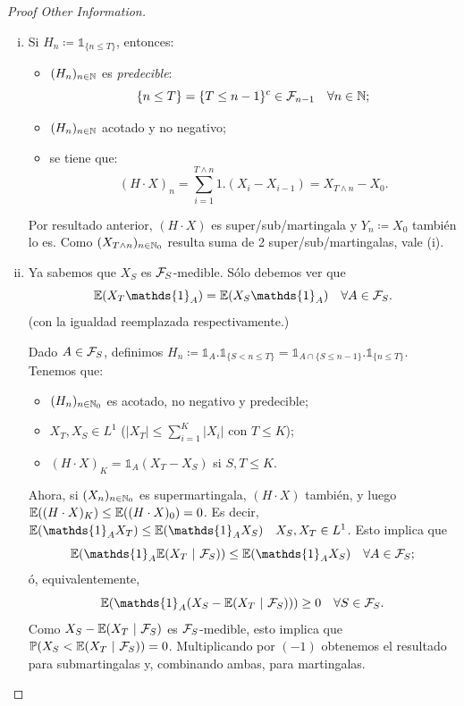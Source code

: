 \begin{proof}[Proof Other Information]
	\begin{enumerate}[i)]
		\item Si $H_{n} \coloneq \mathds{1}_{\{n \leq T\}}$, entonces:
		\begin{itemize}
			\item $(H_{n})_{n \in \mathbb{N}}$ es \textit{predecible}:
			\[ \{n \leq T\} = \{T \leq n - 1\}^{c} \in \mathcal{F}_{n-1} \quad \forall n \in \mathbb{N}; \]

			\item $(H_{n})_{n \in \mathbb{N}}$ acotado y no negativo;

			\item se tiene que:
			\[ (H \cdot X)_{n} = \sum_{i=1}^{T \wedge n} 1 . (X_{i} - X_{i-1}) = X_{T \wedge n} - X_{0}. \]
		\end{itemize}
		Por resultado anterior, $(H \cdot X)$ es super/sub/martingala y $Y_{n} \coloneq X_{0}$ también lo es. Como $(X_{T \wedge n})_{n \in \mathbb{N}_{0}}$ resulta suma de 2 super/sub/martingalas, vale (i).
		
		\item Ya sabemos que $X_{S}$ es $\mathcal{F}_{S}$-medible. Sólo debemos ver que
		\[ \mbb{E}(X_{T} \mathds{1}_{A}) = \mbb{E}(X_{S} \mathds{1}_{A}) \quad \forall A \in \mcal{F}_{S}. \]
		(con la igualdad reemplazada respectivamente.) \par
		Dado $A \in \mathcal{F}_{S}$, definimos $H_{n} \coloneq \mathds{1}_{A} . \mathds{1}_{\{S < n \leq T\}} = \mathds{1}_{A \cap \{S \leq n-1\}} . \mathds{1}_{\{n \leq T\}}$. Tenemos que:
		\begin{itemize}
			\item $(H_{n})_{n \in \mathbb{N}_{0}}$ es acotado, no negativo y predecible;

			\item $X_{T}, X_{S} \in L^{1}$ ($|X_{T}| \leq \sum_{i=1}^{K} |X_{i}|$ con $T \leq K$);

			\item $(H \cdot X)_{K} = \mathds{1}_{A} (X_{T} - X_{S})$ si $S,T \leq K$.
		\end{itemize}
		Ahora, si $(X_{n})_{n \in \mathbb{N}_{0}}$ es supermartingala, $(H \cdot X)$ también, y luego $\mathbb{E}((H \cdot X)_{K}) \leq \mathbb{E}((H \cdot X)_{0}) = 0$. Es decir, $\mbb{E}(\mathds{1}_{A} X_{T}) \leq \mbb{E}(\mathds{1}_{A} X_{S}) \quad X_{S}, X_{T} \in L^{1}$. Esto implica que
		\[ \mbb{E}(\mathds{1}_{A} \mbb{E}(X_{T} \ | \ \mcal{F}_{S})) \leq \mbb{E}(\mathds{1}_{A} X_{S}) \quad \forall A \in \mcal{F}_{S}; \]
		ó, equivalentemente,
		\[ \mbb{E}(\mathds{1}_{A}(X_{S} - \mbb{E}(X_{T} \ | \ \mcal{F}_{S}))) \geq 0 \quad \forall S \in \mcal{F}_{S}. \]
		Como $X_{S} - \mbb{E}(X_{T} \ | \ \mcal{F}_{S})$ es $\mathcal{F}_{S}$-medible, esto implica que $\mbb{P}(X_{S} < \mbb{E}(X_{T} \ | \ \mcal{F}_{S})) = 0$. Multiplicando por $(-1)$ obtenemos el resultado para submartingalas y, combinando ambas, para martingalas.
	\end{enumerate} 
\end{proof}

